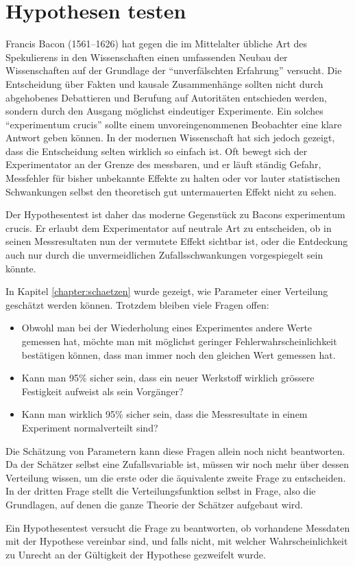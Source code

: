 %
%
%
\chapter{Hypothesen testen} \label{chapter:hypothesen-testen}
Francis Bacon (1561--1626) hat gegen die im Mittelalter übliche
Art des Spekulierens in den Wissenschaften einen umfassenden Neubau
der Wissenschaften auf der Grundlage der ``unverfälschten Erfahrung''
versucht.
Die Entscheidung über Fakten und kausale Zusammenhänge
sollten nicht durch abgehobenes Debattieren und Berufung auf 
Autoritäten entschieden werden, sondern durch den Ausgang
möglichst eindeutiger Experimente.
Ein solches ``experimentum crucis''
sollte einem unvoreingenommenen Beobachter eine klare Antwort geben
können.
In der modernen Wissenschaft hat sich jedoch gezeigt, dass
die Entscheidung selten wirklich so einfach ist.
Oft bewegt sich
der Experimentator an der Grenze des messbaren, und er läuft
ständig Gefahr, Messfehler für bisher unbekannte Effekte zu halten
oder vor lauter statistischen Schwankungen selbst den theoretisch
gut untermauerten Effekt nicht zu sehen.

Der Hypothesentest ist daher das moderne Gegenstück zu Bacons
experimentum crucis.
Er erlaubt dem Experimentator auf neutrale
Art zu entscheiden, ob in seinen Messresultaten nun der vermutete
Effekt sichtbar ist, oder die Entdeckung auch nur durch die unvermeidlichen
Zufallsschwankungen vorgespiegelt sein könnte.

In Kapitel \ref{chapter:schaetzen} wurde gezeigt, wie Parameter einer
Verteilung geschätzt werden können.
Trotzdem bleiben viele Fragen offen:
\begin{itemize}
\item Obwohl man bei der Wiederholung eines Experimentes andere Werte
gemessen hat, möchte man mit möglichst geringer Fehlerwahrscheinlichkeit
bestätigen können, dass man immer noch den gleichen Wert gemessen hat.
\item Kann man 95\% sicher sein, dass ein neuer Werkstoff wirklich grössere
Festigkeit aufweist als sein Vorgänger?
\item Kann man wirklich 95\% sicher sein, dass die Messresultate
in einem Experiment normalverteilt sind?
\end{itemize}
Die Schätzung von Parametern kann diese Fragen allein noch nicht beantworten.
Da der Schätzer selbst eine Zufallsvariable ist, müssen wir noch
mehr über dessen Verteilung wissen, um die erste oder die äquivalente
zweite Frage zu entscheiden.
In der dritten Frage stellt die
Verteilungsfunktion selbst in Frage, also die Grundlagen, auf denen
die ganze Theorie der Schätzer aufgebaut wird.

Ein Hypothesentest versucht die Frage zu beantworten, ob vorhandene
Messdaten mit der Hypothese vereinbar sind, und falls nicht, mit welcher
Wahrscheinlichkeit zu Unrecht an der Gültigkeit der Hypothese gezweifelt
wurde.








